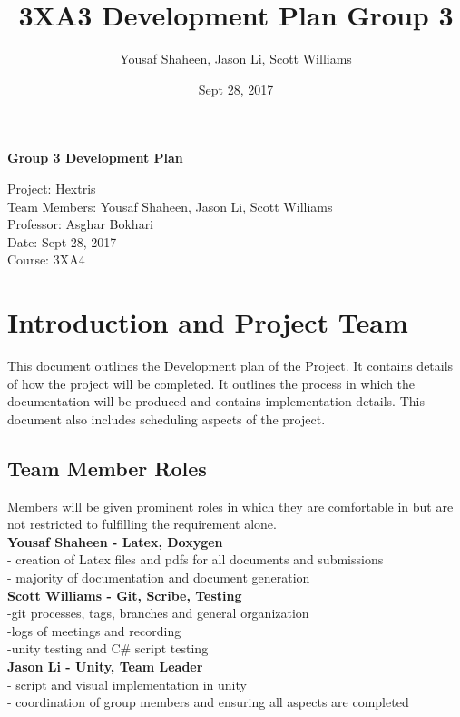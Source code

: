 \documentclass[12pt]{article}
\title{3XA3 Development Plan Group 3}
\author{Yousaf Shaheen, Jason Li, Scott Williams}
\date{Sept 28, 2017}
\begin{document}
\vspace*{7\baselineskip}
\begin{center}
\begin{large}
\textbf{Group 3 Development Plan} \\
\end{large}
Project: Hextris \\
Team Members: Yousaf Shaheen, Jason Li, Scott Williams \\
Professor: Asghar Bokhari \\
Date: Sept 28, 2017 \\
Course: 3XA4  \\
\end{center}

\newpage
\tableofcontents
\newpage



\section{Introduction and Project Team}
This document outlines the Development plan of the Project. It contains details of how the project will be completed. It outlines the process in which the documentation will be produced and contains implementation details. This document also includes scheduling aspects of the project.


\subsection{Team Member Roles}
Members will be given prominent roles in which they are comfortable in but are not restricted to fulfilling the requirement alone.\\

\textbf{Yousaf Shaheen - Latex, Doxygen}\\
	- creation of Latex files and pdfs for all documents and submissions\\
 	- majority of documentation and document generation\\
 	
\textbf{Scott Williams - Git, Scribe, Testing}\\
	-git processes, tags, branches and general organization\\
	-logs of meetings and recording \\
	-unity testing and C\# script testing\\
       
\textbf{Jason Li - Unity, Team Leader} \\
	- script and visual implementation in unity\\
	- coordination of group members and ensuring all aspects are completed \\
\end{document}
